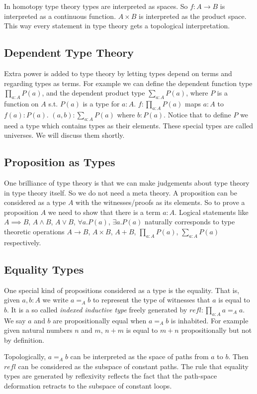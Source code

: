 \documentclass[10pt]{article}
\theoremstyle{definition}
\theoremstyle{plain}
\theoremstyle{remark}
\begin{document}
In homotopy type theory types are interpreted as spaces. So $f : A \to B$ is 
interpreted as a continuous function. $A \times B$ is interpreted as the product space.
This way every statement in type theory gets a topological interpretation.

\subsection{Dependent Type Theory}
Extra power is added to type theory by letting types depend on terms and regarding types as
terms. For example we can define the dependent function type $\prod_{a : A} P(a)$, and the 
dependent product type $\sum_{a : A} P(a)$, where $P$ is a function on $A$ s.t. $P(a)$ is a 
type for $a : A$. $f : \prod_{a : A} P(a)$ maps $a : A$ to 
$f(a) : P(a)$. $(a,b) : \sum_{a : A} P(a)$ where $b : P(a)$. Notice that to define 
$P$ we need a type which contains types as their elements.
These special types are called universes. We will discuss them shortly. 
 
\subsection{Proposition as Types}
One brilliance of type theory is that we can make judgements about type theory in type theory
itself. So we do not need a meta theory. A proposition can be considered as a type $A$ with 
the witnesses/proofs as its elements. So to prove a proposition $A$ we need to show that 
there is a term $a : A$. Logical statements like $A \implies B$, $A \wedge B$, $A \vee B$, 
$\forall a. P(a)$, $\exists a. P(a)$ naturally corresponds to type theoretic operations 
$A \to B$, $A \times B$, $A + B$, $\prod_{a : A} P(a)$, $\sum_{a : A} P(a)$
respectively.\smallskip

\subsection{Equality Types}
One special kind of propositions considered as a type is the equality. That is, 
given $a,b : A$ we write $a =_A b$ to represent the type of witnesses that $a$ is equal to $b$. 
It is a so called \emph{indexed inductive type} freely generated by 
${refl} :\prod_{a : A} a =_A a$. We say $a$ and $b$ are propositionally equal 
when $a =_A b$ is inhabited. For example given natural numbers $n$ and $m$, 
$n+m$ is equal to $m+n$ propositionally but not by definition.
\smallskip

Topologically, $a =_A b$ can be interpreted as the space of paths from $a$ to $b$. Then 
${refl}$ can be considered as the subspace of constant paths. The rule that equality
types are generated by reflexivity reflects the fact that the path-space deformation retracts
to the subspace of constant loops.
\end{document}
